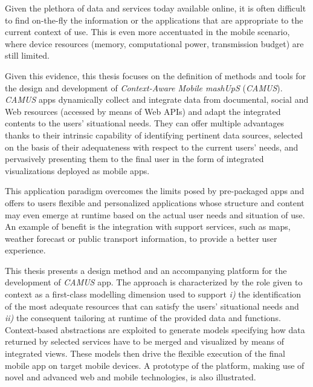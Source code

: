 %

Given the plethora of data and services today available online, it is often difficult to find on-the-fly the information or the applications that are appropriate to the current context of use. This is even more accentuated in the mobile scenario, where device resources (memory, computational power, transmission budget) are still limited. 

Given this evidence, this thesis focuses on the definition of methods and tools for the design and development of \emph{Context-Aware Mobile mashUpS} (\emph{CAMUS}). \emph{CAMUS} apps dynamically collect and integrate data from documental, social and Web resources (accessed by means of Web APIs) and adapt the integrated contents to the users’ situational needs. They can offer multiple advantages thanks to their intrinsic capability of identifying pertinent data sources, selected on the basis of their adequateness with respect to the current users’ needs, and pervasively presenting them to the final user in the form of integrated visualizations deployed as mobile apps.

This application paradigm overcomes the limits posed by pre-packaged apps and offers to users flexible and personalized applications whose structure and content may even emerge at runtime based on the actual user needs and situation of use. An example of benefit is the integration with support services, such as maps, weather forecast or public transport information, to provide a better user experience.

This thesis presents a design method and an accompanying platform for the development of \emph{CAMUS} app. The approach is characterized by the role given to context as a first-class modelling dimension used to support \emph{i)} the identification of the most adequate resources that can satisfy the users' situational needs and \emph{ii)} the consequent tailoring at runtime of the provided data and functions. Context-based abstractions are exploited to generate models specifying how data returned by selected services have to be merged and visualized by means of integrated views. These models then drive the flexible execution of the final mobile app on target mobile devices. A prototype of the platform, making use of novel and advanced web and mobile technologies, is also illustrated.

%
